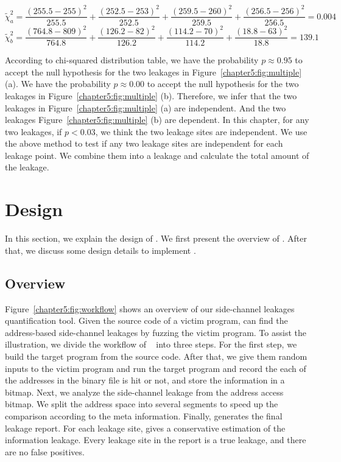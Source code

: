 \[\tilde{\chi}^2_{a}= \frac{(255.5-255)^2}{255.5} + \frac{(252.5-253)^2}{252.5} + \frac{(259.5-260)^2}{259.5} + \frac{(256.5-256)^2}{256.5} = 0.004\] 
\[\tilde{\chi}^2_{b}= \frac{(764.8-809)^2}{764.8} + \frac{(126.2-82)^2}{126.2} + \frac{(114.2-70)^2}{114.2} + \frac{(18.8-63)^2}{18.8} = 139.1\] 

According to chi-squared distribution table, we have the probability $p\approx0.95$ to accept the null hypothesis for the two leakages in Figure~\ref{chapter5:fig:multiple} (a). We have the probability $p\approx0.00$ to accept the null hypothesis for the two leakages in Figure~\ref{chapter5:fig:multiple} (b). Therefore, we infer that the two leakages in Figure~\ref{chapter5:fig:multiple} (a) are independent. And the two leakages Figure~\ref{chapter5:fig:multiple} (b) are dependent. In this chapter, for any two leakages, if $p < 0.03$, we think the two leakage sites are independent. We use the above method to test if any two leakage sites are independent for each leakage point. We combine them into a leakage and calculate the total amount of the leakage.
\section{Design}
In this section, we explain the design of \ctool{}.
We first present the overview of \ctool{}. After that, we discuss some design details to implement \ctool{}.

\subsection{Overview}
Figure~\ref{chapter5:fig:workflow} shows an overview of our side-channel leakages quantification tool. Given the source code of a victim program, \ctool{} can find the address-based side-channel leakages by fuzzing the victim program. To assist the illustration, we divide the workflow of ~\ctool{} into three steps. For the first step, we build the target program from the source code. After that, we give them random inputs to the victim program and run the target program and record the each of the addresses in the binary file is hit or not, and store the information in a bitmap. Next, we analyze the side-channel leakage from the address access bitmap. We split the address space into several segments to speed up the comparison according to the meta information. Finally, \ctool{} generates the final leakage report. For each leakage site, \ctool{} gives a conservative estimation of the information leakage. Every leakage site in the report is a true leakage, and there are no false positives.

